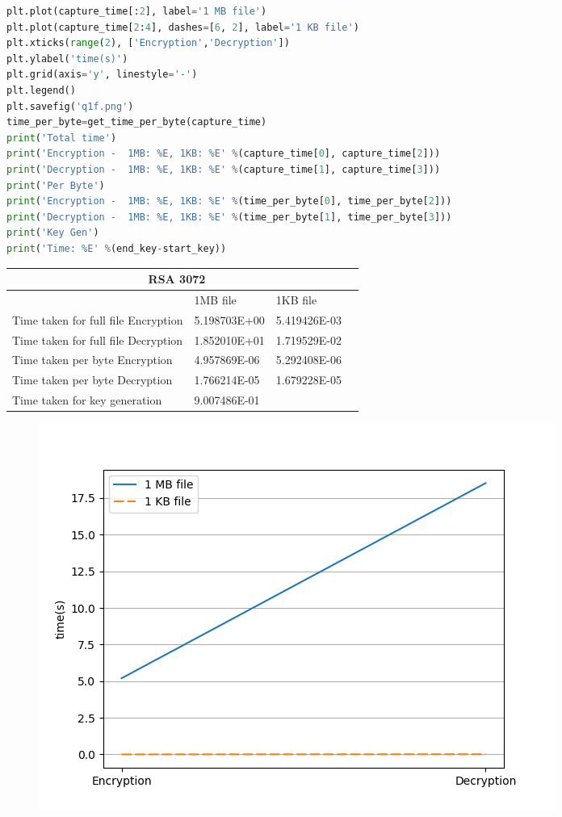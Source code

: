 \documentclass[12pt]{article}%
\begin{document}
\begin{lstlisting}[language=Python]
plt.plot(capture_time[:2], label='1 MB file')
plt.plot(capture_time[2:4], dashes=[6, 2], label='1 KB file')
plt.xticks(range(2), ['Encryption','Decryption'])
plt.ylabel('time(s)')
plt.grid(axis='y', linestyle='-')
plt.legend()
plt.savefig('q1f.png')
time_per_byte=get_time_per_byte(capture_time)
print('Total time')
print('Encryption -  1MB: %E, 1KB: %E' %(capture_time[0], capture_time[2]))
print('Decryption -  1MB: %E, 1KB: %E' %(capture_time[1], capture_time[3]))
print('Per Byte')
print('Encryption -  1MB: %E, 1KB: %E' %(time_per_byte[0], time_per_byte[2]))
print('Decryption -  1MB: %E, 1KB: %E' %(time_per_byte[1], time_per_byte[3]))
print('Key Gen')
print('Time: %E' %(end_key-start_key))

\end{lstlisting}
\begin{tabular}{ |p{8cm}|p{3cm}|p{3cm}|p{3cm} }
 \hline
 \multicolumn{3}{|c|}{RSA 3072} \\
 \hline
	 & 1MB file & 1KB file\\
 \hline
 Time taken for full file Encryption   &  5.198703E+00    &  5.419426E-03 \\
  \hline
 Time taken for full file Decryption & 1.852010E+01   & 1.719529E-02	\\
 \hline
 Time taken per byte Encryption   &   4.957869E-06   &  5.292408E-06 \\
  \hline
 Time taken per byte Decryption & 1.766214E-05   & 1.679228E-05	\\
 \hline
 Time taken for key generation & 9.007486E-01   & 	\\
 \hline
\end{tabular}

\begin{figure}[h]
    \centering
	\includegraphics[scale=0.5]{q1f}
\end{figure}
\end{document}
